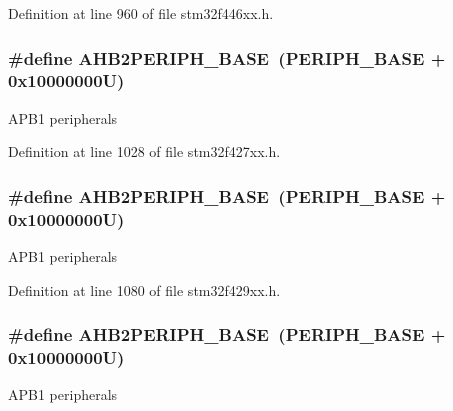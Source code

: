 Definition at line 960 of file stm32f446xx.\+h.

\subsubsection[{\texorpdfstring{A\+H\+B2\+P\+E\+R\+I\+P\+H\+\_\+\+B\+A\+SE}{AHB2PERIPH_BASE}}]{\setlength{\rightskip}{0pt plus 5cm}\#define A\+H\+B2\+P\+E\+R\+I\+P\+H\+\_\+\+B\+A\+SE~({\bf P\+E\+R\+I\+P\+H\+\_\+\+B\+A\+SE} + 0x10000000\+U)}\hypertarget{group___peripheral__memory__map_gaeedaa71d22a1948492365e2cd26cfd46}{}\label{group___peripheral__memory__map_gaeedaa71d22a1948492365e2cd26cfd46}
A\+P\+B1 peripherals 

Definition at line 1028 of file stm32f427xx.\+h.

\subsubsection[{\texorpdfstring{A\+H\+B2\+P\+E\+R\+I\+P\+H\+\_\+\+B\+A\+SE}{AHB2PERIPH_BASE}}]{\setlength{\rightskip}{0pt plus 5cm}\#define A\+H\+B2\+P\+E\+R\+I\+P\+H\+\_\+\+B\+A\+SE~({\bf P\+E\+R\+I\+P\+H\+\_\+\+B\+A\+SE} + 0x10000000\+U)}\hypertarget{group___peripheral__memory__map_gaeedaa71d22a1948492365e2cd26cfd46}{}\label{group___peripheral__memory__map_gaeedaa71d22a1948492365e2cd26cfd46}
A\+P\+B1 peripherals 

Definition at line 1080 of file stm32f429xx.\+h.

\subsubsection[{\texorpdfstring{A\+H\+B2\+P\+E\+R\+I\+P\+H\+\_\+\+B\+A\+SE}{AHB2PERIPH_BASE}}]{\setlength{\rightskip}{0pt plus 5cm}\#define A\+H\+B2\+P\+E\+R\+I\+P\+H\+\_\+\+B\+A\+SE~({\bf P\+E\+R\+I\+P\+H\+\_\+\+B\+A\+SE} + 0x10000000\+U)}\hypertarget{group___peripheral__memory__map_gaeedaa71d22a1948492365e2cd26cfd46}{}\label{group___peripheral__memory__map_gaeedaa71d22a1948492365e2cd26cfd46}
A\+P\+B1 peripherals 

